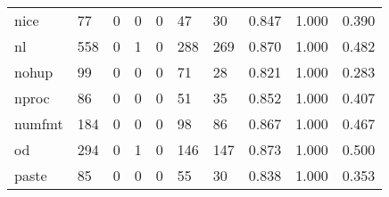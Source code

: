 \begin{longtable}{lp{2.0cm}p{2.0cm}p{2.0cm}p{2.0cm}p{2.0cm}p{2.0cm}p{2.0cm}p{2.0cm}p{2.0cm}}
nice      &                     77 &                                             0 &                                            0 &                                           0 &                                           47 &                                         30 &                                0.847 &                                  1.000 &                                0.390 \\
nl        &                    558 &                                             0 &                                            1 &                                           0 &                                          288 &                                        269 &                                0.870 &                                  1.000 &                                0.482 \\
nohup     &                     99 &                                             0 &                                            0 &                                           0 &                                           71 &                                         28 &                                0.821 &                                  1.000 &                                0.283 \\
nproc     &                     86 &                                             0 &                                            0 &                                           0 &                                           51 &                                         35 &                                0.852 &                                  1.000 &                                0.407 \\
numfmt    &                    184 &                                             0 &                                            0 &                                           0 &                                           98 &                                         86 &                                0.867 &                                  1.000 &                                0.467 \\
od        &                    294 &                                             0 &                                            1 &                                           0 &                                          146 &                                        147 &                                0.873 &                                  1.000 &                                0.500 \\
paste     &                     85 &                                             0 &                                            0 &                                           0 &                                           55 &                                         30 &                                0.838 &                                  1.000 &                                0.353 \\

\end{longtable}
